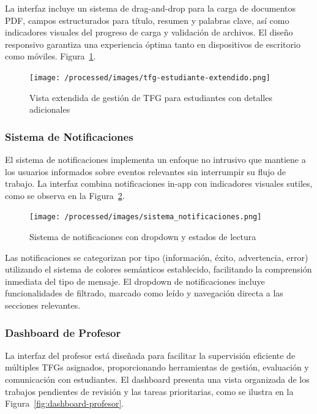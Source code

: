 \documentclass[12pt,a4paper,oneside]{report}
\begin{document}
La interfaz incluye un sistema de drag-and-drop para la carga de documentos PDF, campos estructurados para título, resumen y palabras clave, así como indicadores visuales del progreso de carga y validación de archivos. El diseño responsivo garantiza una experiencia óptima tanto en dispositivos de escritorio como móviles. Figura~\ref{fig:tfg-estudiante-extendido}.

\begin{figure}[H]
\centering
\texttt{[image: /processed/images/tfg-estudiante-extendido.png]}
\caption{Vista extendida de gestión de TFG para estudiantes con detalles adicionales}
\label{fig:tfg-estudiante-extendido}
\end{figure}

\subsubsection{Sistema de Notificaciones}\label{sistema-de-notificaciones}

El sistema de notificaciones implementa un enfoque no intrusivo que mantiene a los usuarios informados sobre eventos relevantes sin interrumpir su flujo de trabajo. La interfaz combina notificaciones in-app con indicadores visuales sutiles, como se observa en la Figura~\ref{fig:sistema-notificaciones}.

\begin{figure}[H]
\centering
\texttt{[image: /processed/images/sistema\_notificaciones.png]}
\caption{Sistema de notificaciones con dropdown y estados de lectura}
\label{fig:sistema-notificaciones}
\end{figure}

Las notificaciones se categorizan por tipo (información, éxito, advertencia, error) utilizando el sistema de colores semánticos establecido, facilitando la comprensión inmediata del tipo de mensaje. El dropdown de notificaciones incluye funcionalidades de filtrado, marcado como leído y navegación directa a las secciones relevantes.

\subsubsection{Dashboard de Profesor}\label{dashboard-de-profesor}

La interfaz del profesor está diseñada para facilitar la supervisión eficiente de múltiples TFGs asignados, proporcionando herramientas de gestión, evaluación y comunicación con estudiantes. El dashboard presenta una vista organizada de los trabajos pendientes de revisión y las tareas prioritarias, como se ilustra en la Figura~\ref{fig:dashboard-profesor}.
\end{document}
